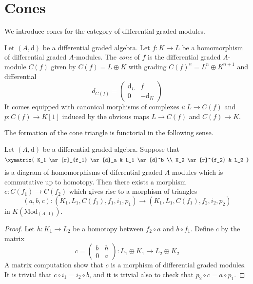 \section{Cones}
\label{section-cones}

\noindent
We introduce cones for the category of differential graded modules.

\begin{definition}
\label{definition-cone}
Let $(A, \text{d})$ be a differential graded algebra.
Let $f : K \to L$ be a homomorphism of differential graded $A$-modules.
The {\it cone} of $f$ is the differential graded $A$-module
$C(f)$ given by $C(f) = L \oplus K$ with grading
$C(f)^n = L^n \oplus K^{n + 1}$ and
differential
$$
d_{C(f)} =
\left(
\begin{matrix}
\text{d}_L & f \\
0 & -\text{d}_K
\end{matrix}
\right)
$$
It comes equipped with canonical morphisms of complexes $i : L \to C(f)$
and $p : C(f) \to K[1]$ induced by the obvious maps $L \to C(f)$
and $C(f) \to K$.
\end{definition}

\noindent
The formation of the cone triangle is functorial in the following sense.

\begin{lemma}
\label{lemma-functorial-cone}
Let $(A, \text{d})$ be a differential graded algebra.
Suppose that
$$
\xymatrix{
K_1 \ar[r]_{f_1} \ar[d]_a & L_1 \ar[d]^b \\
K_2 \ar[r]^{f_2} & L_2
}
$$
is a diagram of homomorphisms of diferential graded $A$-modules which is
commutative up to homotopy.
Then there exists a morphism $c : C(f_1) \to C(f_2)$ which gives rise to
a morphism of triangles
$$
(a, b, c) : (K_1, L_1, C(f_1), f_1, i_1, p_1) \to
(K_1, L_1, C(f_1), f_2, i_2, p_2)
$$
in $K(\text{Mod}_{(A, \text{d})})$.
\end{lemma}

\begin{proof}
Let $h : K_1 \to L_2$ be a homotopy between $f_2 \circ a$ and $b \circ f_1$.
Define $c$ by the matrix
$$
c =
\left(
\begin{matrix}
b & h \\
0 & a
\end{matrix}
\right) :
L_1 \oplus K_1 \to L_2 \oplus K_2
$$
A matrix computation show that $c$ is a morphism of differential
graded modules. It is trivial that $c \circ i_1 = i_2 \circ b$, and it is
trivial also to check that $p_2 \circ c = a \circ p_1$.
\end{proof}











